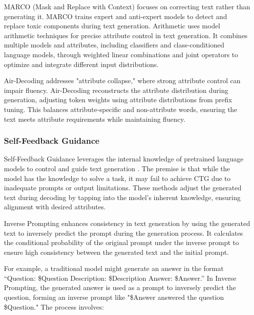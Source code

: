 \documentclass[acmsmall, screen]{acmart}
\begin{document}
MARCO (Mask and Replace with Context) \cite{hallinan_acl23_MARCO} focuses on correcting text rather than generating it. MARCO trains expert and anti-expert models to detect and replace toxic components during text generation.
Arithmetic \cite{dekoninck_iclr24_Arithmetic} uses model arithmetic techniques for precise attribute control in text generation. It combines multiple models and attributes, including classifiers and class-conditioned language models, through weighted linear combinations and joint operators to optimize and integrate different input distributions.

Air-Decoding \cite{zhong_acl23_Air-Decoding} addresses "attribute collapse," where strong attribute control can impair fluency. Air-Decoding reconstructs the attribute distribution during generation, adjusting token weights using attribute distributions from prefix tuning. This balances attribute-specific and non-attribute words, ensuring the text meets attribute requirements while maintaining fluency.

\subsubsection{\textbf{Self-Feedback Guidance}} 
Self-Feedback Guidance leverages the internal knowledge of pretrained language models to control and guide text generation \cite{liang_arxiv24_ICSF}. The premise is that while the model has the knowledge to solve a task, it may fail to achieve CTG due to inadequate prompts or output limitations. These methods adjust the generated text during decoding by tapping into the model's inherent knowledge, ensuring alignment with desired attributes.

Inverse Prompting \cite{zou_KDD21_Inverse-Prompting} enhances consistency in text generation by using the generated text to inversely predict the prompt during the generation process. It calculates the conditional probability of the original prompt under the inverse prompt to ensure high consistency between the generated text and the initial prompt.

For example, a traditional model might generate an answer in the format “Question: \${Question} Description: \${Description} Answer: \${Answer}.” In Inverse Prompting, the generated answer is used as a prompt to inversely predict the question, forming an inverse prompt like "\${Answer} answered the question \${Question}." The process involves:
\end{document}

